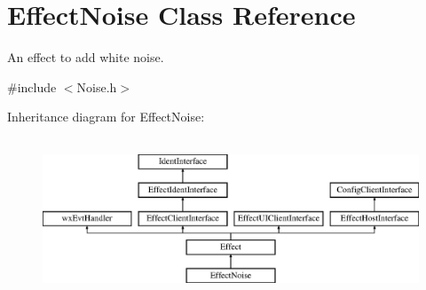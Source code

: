 \hypertarget{class_effect_noise}{}\section{Effect\+Noise Class Reference}
\label{class_effect_noise}


An effect to add white noise.  




{\ttfamily \#include $<$Noise.\+h$>$}

Inheritance diagram for Effect\+Noise\+:\begin{figure}[H]
\begin{center}
\leavevmode
\includegraphics[height=4.794520cm]{class_effect_noise}
\end{center}
\end{figure}

